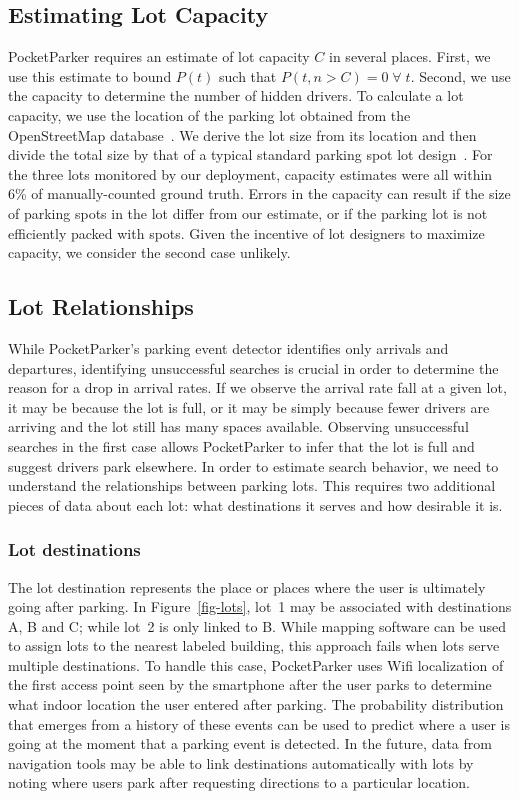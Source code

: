 \documentclass{sigchi}
\begin{document}
\subsection{Estimating Lot Capacity}

PocketParker requires an estimate of lot capacity $C$ in several places.
First, we use this estimate to bound $P(t)$ such that $P(t, n > C) =
0\;\forall\;t$. Second, we use the capacity to determine the number of hidden
drivers. To calculate a lot capacity, we use the location of the parking lot
obtained from the OpenStreetMap database~\cite{openstreetmap}. We derive the
lot size from its location and then divide the total size by that of a
typical standard parking spot lot design~\cite{parkingdesign}. For the three
lots monitored by our deployment, capacity estimates were all within 6\% of
manually-counted ground truth. Errors in the capacity can result if the size
of parking spots in the lot differ from our estimate, or if the parking lot
is not efficiently packed with spots. Given the incentive of lot
designers to maximize capacity, we consider the second case unlikely.

\subsection{Lot Relationships}

While PocketParker's parking event detector identifies only arrivals and
departures, identifying unsuccessful searches is crucial in order to
determine the reason for a drop in arrival rates. If we observe the arrival
rate fall at a given lot, it may be because the lot is full, or it may be
simply because fewer drivers are arriving and the lot still has many spaces
available. Observing unsuccessful searches in the first case allows
PocketParker to infer that the lot is full and suggest drivers park
elsewhere. In order to estimate search behavior, we need to understand the
relationships between parking lots. This requires two additional pieces of
data about each lot: what destinations it serves and how desirable it is.

\subsubsection{Lot destinations}

The lot destination represents the place or places where the user is
ultimately going after parking. In Figure~\ref{fig-lots}, lot~1 may be
associated with destinations A, B and C; while lot~2 is only linked to B.
While mapping software can be used to assign lots to the nearest labeled
building, this approach fails when lots serve multiple destinations. To
handle this case, PocketParker uses Wifi localization of the first access
point seen by the smartphone after the user parks to determine what indoor
location the user entered after parking. The probability distribution that
emerges from a history of these events can be used to predict where a user is
going at the moment that a parking event is detected. In the future, data
from navigation tools may be able to link destinations automatically with
lots by noting where users park after requesting directions to a particular
location.
\end{document}
